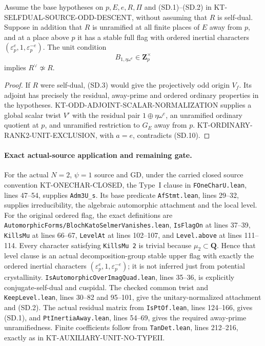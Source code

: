 \begin{corollary}
Assume the base hypotheses on $p,E,e,R,\Pi$ and (SD.1)--(SD.2)
in KT-SELFDUAL-SOURCE-ODD-DESCENT, without assuming that $R$ is
self-dual.  Suppose in addition that $R$ is unramified at all finite places of $E$
away from $p$, and at a place above $p$ it has a stable full flag
with ordered inertial characters
$(\varepsilon_p^e,1,\varepsilon_p^{-e})$.
The unit condition
\[
                          B_{1,\eta\omega^e}\in\mathbf Z_p^\times
                                                               \tag{SD.10}
\]
implies $R^\vee\not\simeq R$.
\end{corollary}

\begin{proof}
If $R$ were self-dual, (SD.3) would give the projectively odd
origin $V_f$.  Its adjoint has precisely the residual,
away-prime and ordered ordinary properties in the hypotheses.
KT-ODD-ADJOINT-SCALAR-NORMALIZATION supplies a global scalar
twist $V'$ with the residual pair $1\oplus\eta\omega^e$,
an unramified ordinary quotient at $p$, and unramified
restriction to $G_E$ away from $p$.
KT-ORDINARY-RANK2-UNIT-EXCLUSION, with $a=e$, contradicts
(SD.10).
\end{proof}

\paragraph{Exact actual-source application and remaining gate.}
For the actual $N=2$, $\psi=1$ source and GD, under the carried
closed source convention KT-ONECHAR-CLOSED, the Type~I clause
in \texttt{FOneCharU.lean}, lines 47--54, supplies
\texttt{Adm3U\_s}.  Its base predicate
\texttt{AfStmt.lean}, lines 29--32, supplies irreducibility,
the algebraic automorphic attachment and the local level.
For the original ordered flag, the exact definitions are
\texttt{AutomorphicForms/BlochKatoSelmerVanishes.lean},
\texttt{IsFlagOn} at lines 37--39, \texttt{KillsMu} at
lines 66--67, \texttt{LevelAt} at lines 102--107, and
\texttt{Level.above} at lines 111--114.
Every character satisfying \texttt{KillsMu 2} is trivial because
$\mu_2\subset\mathbf Q$.  Hence that level clause is an actual
decomposition-group stable upper flag with exactly the ordered
inertial characters $(\varepsilon_p^e,1,\varepsilon_p^{-e})$;
it is not inferred just from potential crystallinity.
\texttt{IsAutomorphicOverImagQuad.lean}, lines 35--36, is
explicitly conjugate-self-dual and cuspidal.
The checked common twist and \texttt{KeepLevel.lean},
lines 30--82 and 95--101, give the unitary-normalized attachment
and (SD.2).  The actual residual matrix from
\texttt{IsPtOf.lean}, lines 124--166, gives (SD.1), and
\texttt{PtInertiaAway.lean}, lines 54--69, gives the required
away-prime unramifiedness.  Finite coefficients follow from
\texttt{TanDet.lean}, lines 212--216, exactly as in
KT-AUXILIARY-UNIT-NO-TYPEII.


